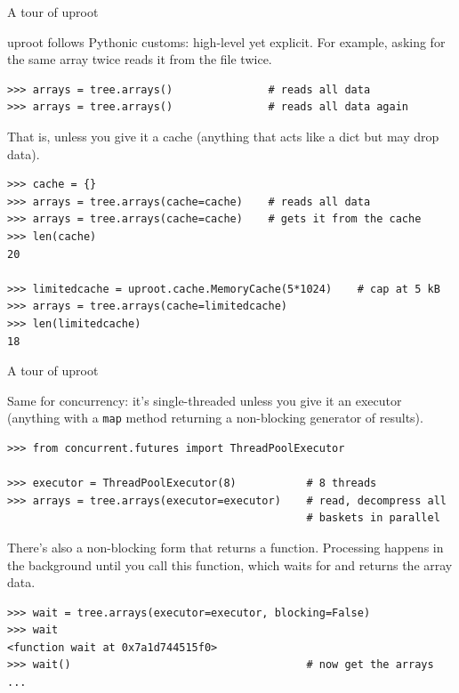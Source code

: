 \documentclass[aspectratio=169]{beamer}
\begin{document}
\begin{frame}[fragile]{A tour of uproot}
\vspace{0.5 cm}
\small

{\normalsize uproot follows Pythonic customs: high-level yet explicit. For example, asking for the same array twice reads it from the file twice.}

\begin{verbatim}
>>> arrays = tree.arrays()               # reads all data
>>> arrays = tree.arrays()               # reads all data again
\end{verbatim}

\vspace{0.2 cm}
{\normalsize That is, unless you give it a cache (anything that acts like a dict but may drop data).}

\begin{verbatim}
>>> cache = {}
>>> arrays = tree.arrays(cache=cache)    # reads all data
>>> arrays = tree.arrays(cache=cache)    # gets it from the cache
>>> len(cache)
20

>>> limitedcache = uproot.cache.MemoryCache(5*1024)    # cap at 5 kB
>>> arrays = tree.arrays(cache=limitedcache)
>>> len(limitedcache)
18
\end{verbatim}
\end{frame}

\begin{frame}[fragile]{A tour of uproot}
\label{page:executor}\vspace{0.5 cm}
\small

{\normalsize Same for concurrency: it's single-threaded unless you give it an executor (anything with a {\tt\small map} method returning a non-blocking generator of results).}

\begin{verbatim}
>>> from concurrent.futures import ThreadPoolExecutor

>>> executor = ThreadPoolExecutor(8)           # 8 threads
>>> arrays = tree.arrays(executor=executor)    # read, decompress all
                                               # baskets in parallel
\end{verbatim}

\vspace{0.2 cm}
{\normalsize There's also a non-blocking form that returns a function. Processing happens in the background until you call this function, which waits for and returns the array data.}

\begin{verbatim}
>>> wait = tree.arrays(executor=executor, blocking=False)
>>> wait
<function wait at 0x7a1d744515f0>
>>> wait()                                     # now get the arrays
...
\end{verbatim}
\end{frame}
\end{document}
